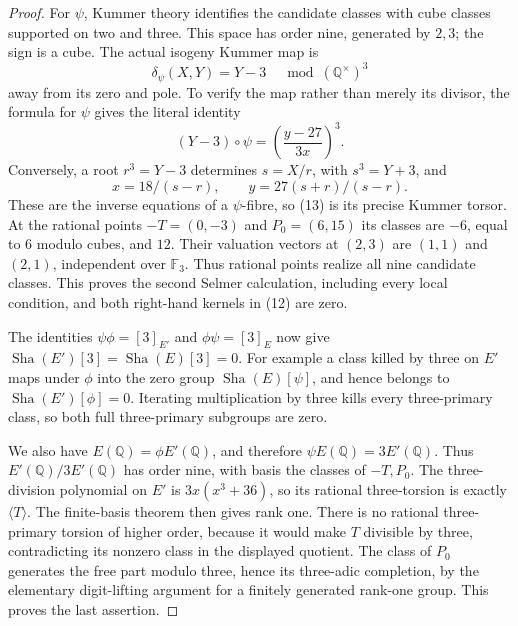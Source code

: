 \begin{proof}
For \(\psi\), Kummer theory identifies the
candidate classes with cube classes supported on
two and three. This space has order nine, generated
by \(2,3\); the sign is a cube. The actual isogeny
Kummer map is
\[
          \delta_\psi(X,Y)=Y-3
                 \quad\bmod(\mathbb Q^\times)^3
                                                        \tag{13}
\]
away from its zero and pole. To verify the map rather
than merely its divisor, the formula for \(\psi\)
gives the literal identity
\[
 (Y-3)\circ\psi
            =\left(\frac{y-27}{3x}\right)^3.
\]
Conversely, a root \(r^3=Y-3\) determines
\(s=X/r\), with \(s^3=Y+3\), and
\[
 x=18/(s-r),\qquad y=27(s+r)/(s-r).
\]
These are the inverse equations of a \(\psi\)-fibre,
so (13) is its precise Kummer torsor. At the rational
points \(-T=(0,-3)\) and \(P_0=(6,15)\) its
classes are \(-6\), equal to \(6\) modulo cubes,
and \(12\). Their valuation vectors at \((2,3)\)
are \((1,1)\) and \((2,1)\), independent over
\(\mathbb F_3\). Thus rational points realize
all nine candidate classes. This proves the second
Selmer calculation, including every local condition,
and both right-hand kernels in (12) are zero.

The identities \(\psi\phi=[3]_{E'}\) and
\(\phi\psi=[3]_E\) now give
\(\operatorname{Sha}(E')[3]=\operatorname{Sha}(E)[3]=0\).
For example a class killed by three on \(E'\)
maps under \(\phi\) into the zero group
\(\operatorname{Sha}(E)[\psi]\), and hence belongs
to \(\operatorname{Sha}(E')[\phi]=0\).
Iterating multiplication by three kills every
three-primary class, so both full three-primary
subgroups are zero.

We also have \(E(\mathbb Q)=\phi E'(\mathbb Q)\),
and therefore
\(\psi E(\mathbb Q)=3E'(\mathbb Q)\).
Thus \(E'(\mathbb Q)/3E'(\mathbb Q)\) has order
nine, with basis the classes of \(-T,P_0\).
The three-division polynomial on \(E'\) is
\(3x(x^3+36)\), so its rational three-torsion
is exactly \(\langle T\rangle\). The finite-basis theorem
\cite[Chapter IV, printed p.~105]{GhostMilneEC}
then gives rank one. There is no rational
three-primary torsion of higher order, because it
would make \(T\) divisible by three, contradicting
its nonzero class in the displayed quotient.
The class of \(P_0\) generates the free part
modulo three, hence its three-adic completion,
by the elementary digit-lifting argument for a
finitely generated rank-one group. This proves
the last assertion.
\end{proof}

